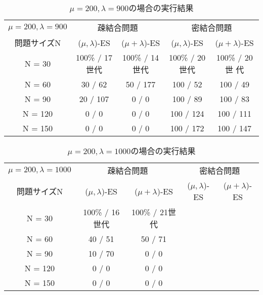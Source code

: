 \documentclass[a4j]{jarticle}
\begin{document}
\begin{table}[htb]
 \begin{center}
  \begin{tabular}[tb]{|c||c|c||c|c|} \hline
   $\mu = 200, \lambda = 900$& \multicolumn{2}{c||}{疎結合問題} &
   \multicolumn{2}{c|}{密結合問題} \\ \cline{2-5}
   問題サイズN& ($\mu, \lambda$)-ES& ($\mu + \lambda$)-ES& ($\mu, \lambda$)-ES&
   ($\mu + \lambda$)-ES \\ \hline \hline
   N = 30& 100\% / 17世代& 100\% / 14世代& 100\% / 20世代& 100\% / 20世
   代\\ \hline
   N = 60& 30 / 62&50 / 177 & 100 / 52& 100 / 49\\ \hline
   N = 90& 20 / 107&0 / 0& 100 / 89& 100 / 83\\ \hline
   N = 120& 0 / 0&0 / 0 & 100 / 124& 100 / 111\\ \hline
   N = 150& 0 / 0&0 / 0 & 100 / 172& 100 / 147\\ \hline
  \end{tabular}
  \caption{$\mu = 200, \lambda = 900$の場合の実行結果}
  \label{29}
 \end{center}
\end{table}
\begin{table}[htb]
 \begin{center}
  \begin{tabular}[tb]{|c||c|c||c|c|} \hline
   $\mu = 200, \lambda = 1000$& \multicolumn{2}{c||}{疎結合問題} &
   \multicolumn{2}{c|}{密結合問題} \\ \cline{2-5}
   問題サイズN& ($\mu, \lambda$)-ES& ($\mu + \lambda$)-ES& ($\mu, \lambda$)-ES&
   ($\mu + \lambda$)-ES \\ \hline \hline
   N = 30& 100\% / 16世代& 100\% / 21世代& & \\ \hline
   N = 60& 40 / 51&50 / 71 & & \\ \hline
   N = 90& 10 / 70&0 / 0 & & \\ \hline
   N = 120& 0 / 0 &0 / 0 & & \\ \hline
   N = 150& 0 / 0&0 / 0 & & \\ \hline
  \end{tabular}
  \caption{$\mu = 200, \lambda = 1000$の場合の実行結果}
  \label{210}
 \end{center}
\end{table}
\end{document}
